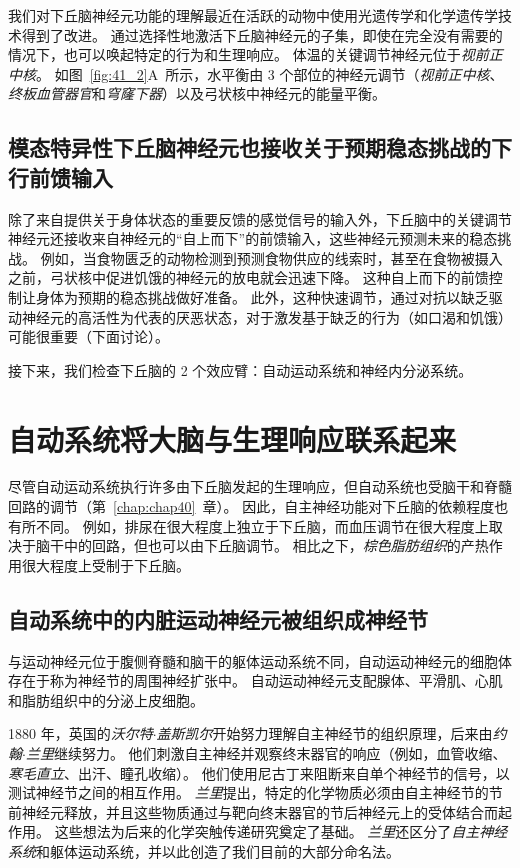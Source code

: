 我们对下丘脑神经元功能的理解最近在活跃的动物中使用光遗传学和化学遗传学技术得到了改进。
通过选择性地激活下丘脑神经元的子集，即使在完全没有需要的情况下，也可以唤起特定的行为和生理响应。
体温的关键调节神经元位于\textit{视前正中核}。
如图~\ref{fig:41_2}A~所示，水平衡由 3 个部位的神经元调节（\textit{视前正中核}、\textit{终板血管器官}和\textit{穹窿下器}）以及弓状核中神经元的能量平衡。



\subsection{模态特异性下丘脑神经元也接收关于预期稳态挑战的下行前馈输入}

除了来自提供关于身体状态的重要反馈的感觉信号的输入外，下丘脑中的关键调节神经元还接收来自神经元的“自上而下”的前馈输入，这些神经元预测未来的稳态挑战。
例如，当食物匮乏的动物检测到预测食物供应的线索时，甚至在食物被摄入之前，弓状核中促进饥饿的神经元的放电就会迅速下降。
这种自上而下的前馈控制让身体为预期的稳态挑战做好准备。
此外，这种快速调节，通过对抗以缺乏驱动神经元的高活性为代表的厌恶状态，对于激发基于缺乏的行为（如口渴和饥饿）可能很重要（下面讨论）。


接下来，我们检查下丘脑的 2 个效应臂：自动运动系统和神经内分泌系统。



\section{自动系统将大脑与生理响应联系起来}

尽管自动运动系统执行许多由下丘脑发起的生理响应，但自动系统也受脑干和脊髓回路的调节（第~\ref{chap:chap40}~章）。
因此，自主神经功能对下丘脑的依赖程度也有所不同。
例如，排尿在很大程度上独立于下丘脑，而血压调节在很大程度上取决于脑干中的回路，但也可以由下丘脑调节。
相比之下，\textit{棕色脂肪组织}的产热作用很大程度上受制于下丘脑。



\subsection{自动系统中的内脏运动神经元被组织成神经节}

与运动神经元位于腹侧脊髓和脑干的躯体运动系统不同，自动运动神经元的细胞体存在于称为神经节的周围神经扩张中。
自动运动神经元支配腺体、平滑肌、心肌和脂肪组织中的分泌上皮细胞。


1880 年，英国的\textit{沃尔特$\cdot$盖斯凯尔}开始努力理解自主神经节的组织原理，后来由\textit{约翰$\cdot$兰里}继续努力。
他们刺激自主神经并观察终末器官的响应（例如，血管收缩、\textit{寒毛直立}、出汗、瞳孔收缩）。
他们使用尼古丁来阻断来自单个神经节的信号，以测试神经节之间的相互作用。
\textit{兰里}提出，特定的化学物质必须由自主神经节的节前神经元释放，并且这些物质通过与靶向终末器官的节后神经元上的受体结合而起作用。
这些想法为后来的化学突触传递研究奠定了基础。
\textit{兰里}还区分了\textit{自主神经系统}和躯体运动系统，并以此创造了我们目前的大部分命名法。



